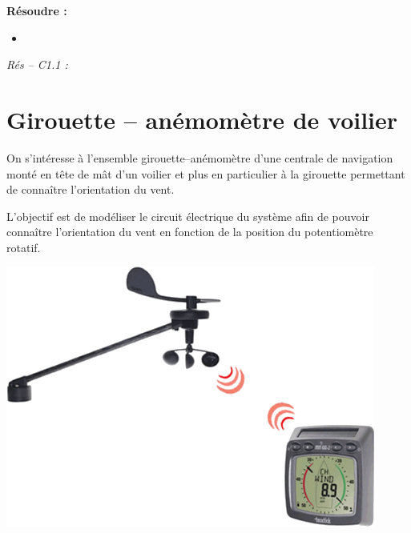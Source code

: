 \documentclass[10pt]{article}
\begin{document}






\begin{comp}
\noindent \textbf{Résoudre :} 
\begin{itemize}
\item 
\end{itemize}

\noindent \textit{Rés -- C1.1 :} 
\end{comp}

\section*{Girouette -- anémomètre de voilier}



\begin{minipage}[c]{.6\linewidth}
On s'intéresse à l'ensemble girouette--anémomètre d'une centrale de navigation monté en tête de mât d'un voilier et plus en particulier à la girouette permettant de connaître l'orientation du vent. 
\begin{obj}
L'objectif est de modéliser le circuit électrique du système afin de pouvoir connaître l'orientation du vent en fonction de la position du potentiomètre rotatif.
\end{obj}

\end{minipage} \hfill
\begin{minipage}[c]{.35\linewidth}
\begin{center}
\includegraphics[width=\textwidth]{images/GirouetteAnemometre}
\end{center}
\end{minipage}
\end{document}
